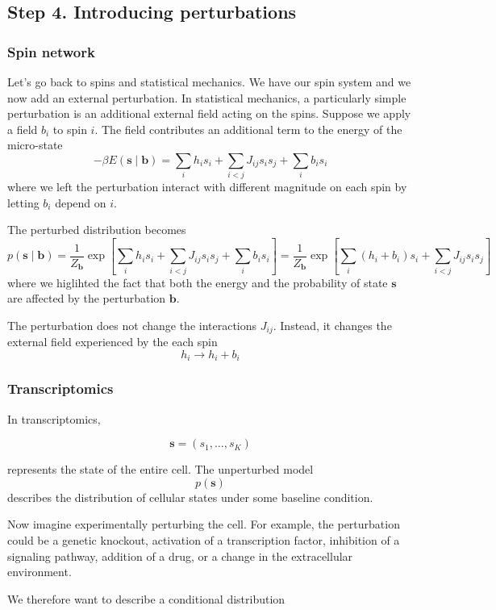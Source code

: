 \documentclass[11pt,a4paper]{article}
\begin{document}
\subsection{Step 4. Introducing perturbations}

\subsubsection{Spin network}

Let's go back to spins and statistical mechanics. We have our spin system and we now add an external perturbation. In statistical mechanics, a particularly simple perturbation is an additional external field acting on the spins.
Suppose we apply a field $b_i$ to spin $i$. The field contributes an additional term to the energy of the micro-state
\[
-\beta E(\bm s \mid \bm b)  = 
\sum_i h_i s_i
+
\sum_{i<j}J_{ij}s_is_j
+
\sum_i b_i s_i
\]
where we left the perturbation interact with different magnitude on each spin by letting $b_i$ depend on $i$.

The perturbed distribution becomes
\[
p(\bm{s}\mid \bm{b})
=
\frac{1}{Z_{\bm{b}}}
\exp
\left[
\sum_i h_i s_i
+
\sum_{i<j}J_{ij}s_is_j
+
\sum_i b_i s_i
\right] = 
\frac{1}{Z_{\bm{b}}}
\exp
\left[
\sum_i (h_i+b_i)s_i
+
\sum_{i<j}J_{ij}s_is_j
\right]
\]
where we higlihted the fact that both the energy and the probability of state $\bm s$ are affected by the perturbation $\bm b$.

The perturbation does not change the interactions $J_{ij}$. Instead, it changes the external field experienced by the each spin
\[
h_i
\longrightarrow
h_i+b_i
\]

\subsubsection{Transcriptomics}

In transcriptomics,

\[
\bm{s}
=
(s_1,\ldots,s_K)
\]

represents the state of the entire cell. The unperturbed model
\[
p(\bm{s})
\]
describes the distribution of cellular states under some baseline condition.

Now imagine experimentally perturbing the cell. For example, the perturbation could be a genetic knockout, activation of a transcription factor, inhibition of a signaling pathway, addition of a drug, or a change in the extracellular environment.

We therefore want to describe a conditional distribution
\end{document}
